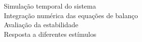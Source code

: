 \documentclass[preview]{standalone}
\begin{document}
Simulação temporal do sistema\\Integração numérica das equações de balanço\\Avaliação da estabilidade\\Resposta a diferentes estímulos\\
\end{document}
